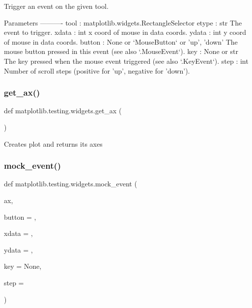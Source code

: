 \begin{DoxyVerb}Trigger an event on the given tool.

Parameters
----------
tool : matplotlib.widgets.RectangleSelector
etype : str
    The event to trigger.
xdata : int
    x coord of mouse in data coords.
ydata : int
    y coord of mouse in data coords.
button : None or `MouseButton` or {'up', 'down'}
    The mouse button pressed in this event (see also `.MouseEvent`).
key : None or str
    The key pressed when the mouse event triggered (see also `.KeyEvent`).
step : int
    Number of scroll steps (positive for 'up', negative for 'down').
\end{DoxyVerb}
 \mbox{\label{namespacematplotlib_1_1testing_1_1widgets_aedcccd23785f9a7f802bc4aa32cd62eb}} 
\subsubsection{\texorpdfstring{get\+\_\+ax()}{get\_ax()}}
{\footnotesize\ttfamily def matplotlib.\+testing.\+widgets.\+get\+\_\+ax (\begin{DoxyParamCaption}{ }\end{DoxyParamCaption})}

\begin{DoxyVerb}Creates plot and returns its axes\end{DoxyVerb}
 \mbox{\label{namespacematplotlib_1_1testing_1_1widgets_ac13ed6feeaf8edc9195366861e34b60d}} 
\subsubsection{\texorpdfstring{mock\+\_\+event()}{mock\_event()}}
{\footnotesize\ttfamily def matplotlib.\+testing.\+widgets.\+mock\+\_\+event (\begin{DoxyParamCaption}\item[{}]{ax,  }\item[{}]{button = {},  }\item[{}]{xdata = {},  }\item[{}]{ydata = {},  }\item[{}]{key = {\ttfamily None},  }\item[{}]{step = {} }\end{DoxyParamCaption})}

